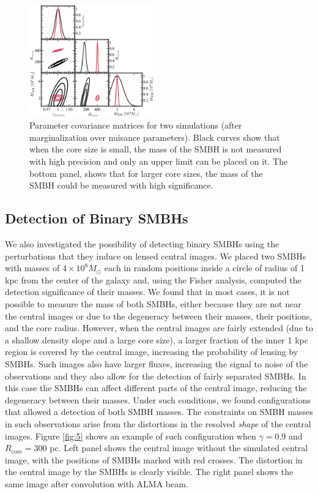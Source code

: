 \documentclass[chicago]{emulateapj}
\begin{document}
\begin{figure}
\begin{center}
\centering
\includegraphics[trim= 2 5 0 0, clip, width=0.48\textwidth]{figures/f_04.eps}
\centering
\end{center}
\caption{ Parameter covariance matrices for two simulations (after marginalization over nuisance parameters). Black curves show that when the core size is small, the mass of the SMBH is not measured with high precision and only an upper limit can be placed on it. The bottom panel, shows that for larger core sizes, the mass of the SMBH could be measured with high significance. 
\label{fig:4}}
\end{figure}


\subsection{Detection of Binary SMBHs}
We also investigated the possibility of detecting binary SMBHs using the perturbations that they induce on lensed central images. 
We placed two SMBHs with masses of $4\times10^8 M_{\odot}$ each in random positions inside a circle of radius of 1 kpc from the center of the galaxy and, using the Fisher analysis, computed the detection significance of their masses. 
We found that in most cases, it is not possible to measure the mass of both SMBHs, either because they are not near the central images or due to the degeneracy between their masses, their positions, and the core radius. %
However, when the central images are fairly extended (due to a shallow density slope and a large core size), a larger fraction of the inner 1 kpc region is covered by the central image, increasing the probability of lensing by SMBHs. Such images also have larger fluxes, increasing the signal to noise of the observations and they also allow for the detection of fairly separated SMBHs. In this case the SMBHs can affect different parts of the central image, reducing the degeneracy between their masses.
Under such conditions, we found configurations that allowed a detection of both SMBH masses. The constraints on SMBH masses in such observations arise from the distortions in the resolved \emph{shape} of the central images. Figure \ref{fig:5} shows an example of such configuration when $\gamma = 0.9$ and $R_{\mathrm{core}}=300$ pc. Left panel shows the central image without the simulated central image, with the positions of SMBHs marked with red crosses. The distortion in the central image by the SMBHs is clearly visible. The right panel shows the same image after convolution with ALMA beam.
\end{document}
